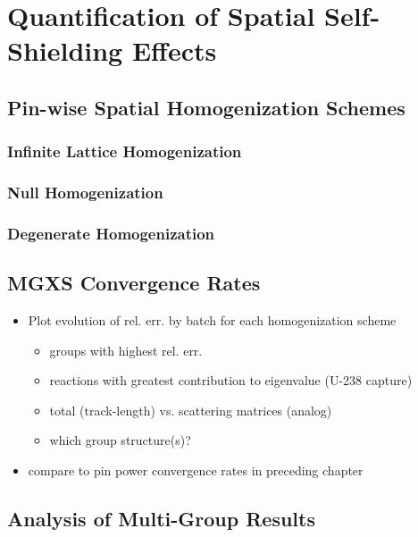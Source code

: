 \chapter{Quantification of Spatial Self-Shielding Effects}
\label{chap:quantify}

\section{Pin-wise Spatial Homogenization Schemes}
\label{sec:chap8-pinwise-space-homogenize}

\subsection{Infinite Lattice Homogenization}

\subsection{Null Homogenization}

\subsection{Degenerate Homogenization}

\section{MGXS Convergence Rates}

\begin{itemize}[noitemsep]
  \item Plot evolution of rel. err. by batch for each homogenization scheme
  \begin{itemize}[noitemsep]
    \item groups with highest rel. err.
    \item reactions with greatest contribution to eigenvalue (U-238 capture)
    \item total (track-length) vs. scattering matrices (analog)    
    \item which group structure(s)?
 \end{itemize}
  \item compare to pin power convergence rates in preceding chapter
\end{itemize}


\section{Analysis of Multi-Group Results}

